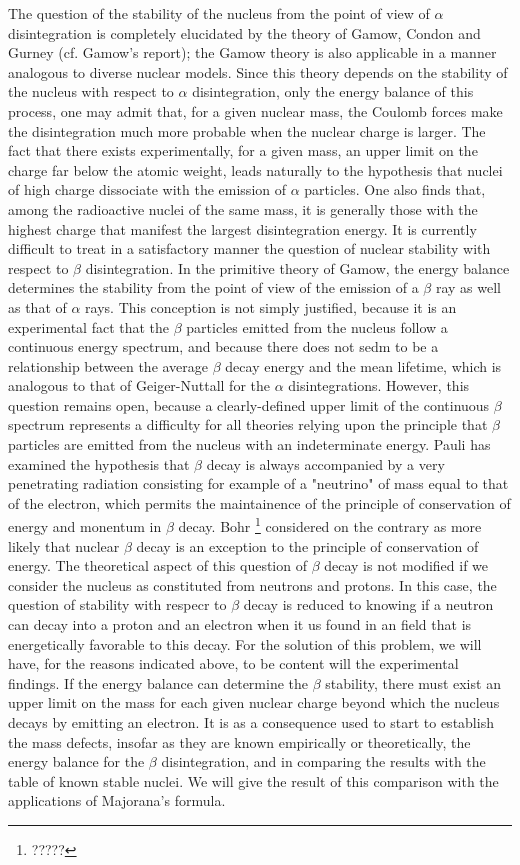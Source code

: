 \documentclass{article}
\begin{document}
The question of the stability of the nucleus from the point of view of $\alpha$ disintegration is completely elucidated by the theory of Gamow, Condon and Gurney (cf. Gamow's report); the Gamow theory is also applicable in a manner analogous to diverse nuclear models. Since this theory depends on the stability of the nucleus with respect to $\alpha$ disintegration, only the energy balance of this process, one may admit that, for a given nuclear mass, the Coulomb forces make the disintegration much more probable when the nuclear charge is larger. The fact that there exists experimentally, for a given mass, an upper limit on the charge far below the atomic weight, leads naturally to the hypothesis that nuclei of high charge dissociate with the emission of $\alpha$ particles. One also finds that, among the radioactive nuclei of the same mass, it is generally those with the highest charge that manifest the largest disintegration energy.
It is currently difficult to treat in a satisfactory manner the question of nuclear stability with respect to $\beta$ disintegration. In the primitive theory of Gamow, the energy balance determines the stability from the point of view of the emission of a $\beta$ ray as well as that of $\alpha$ rays. This conception is not simply justified, because it is an experimental fact that the $\beta$ particles emitted from the nucleus follow a continuous energy spectrum, and because there does not sedm to be a relationship between the average $\beta$ decay energy and the mean lifetime, which is analogous to that of Geiger-Nuttall for the $\alpha$ disintegrations. However, this question remains open, because a clearly-defined upper limit of the continuous $\beta$ spectrum represents a difficulty for all theories relying upon the principle that $\beta$ particles are emitted from the nucleus with an indeterminate energy. Pauli has examined the hypothesis that $\beta$ decay is always accompanied by a very penetrating radiation consisting for example of a "neutrino" of mass equal to that of the electron, which permits the maintainence of the principle of conservation of energy and monentum in $\beta$ decay. Bohr \footnote{?????} considered on the contrary as more likely that nuclear $\beta$ decay is an exception to the principle of conservation of energy.
The theoretical aspect of this question of $\beta$ decay is not modified if we consider the nucleus as constituted from neutrons and protons. In this case, the question of stability with respecr to $\beta$ decay is reduced to knowing if a neutron can decay into a proton and an electron when it us found in an field that is energetically favorable to this decay. For the solution of this problem, we will have, for the reasons indicated above, to be content will the experimental findings. If the energy balance can determine the $\beta$ stability, there must exist an upper limit on the mass for each given nuclear charge beyond which the nucleus decays by emitting an electron. It is as a consequence used to start to establish the mass defects, insofar as they are known empirically or theoretically, the energy balance for the $\beta$ disintegration, and in comparing the results with the table of known stable nuclei. We will give the result of this comparison with the applications of Majorana's formula.
\end{document}
